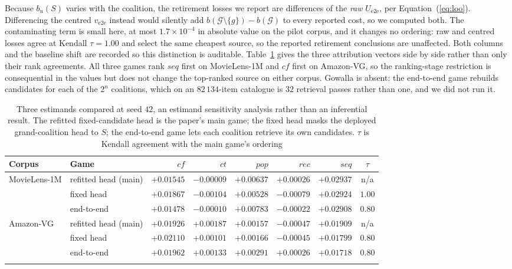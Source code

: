 \documentclass[pdflatex,sn-basic,Numbered]{sn-jnl}
\theoremstyle{plain}
\theoremstyle{definition}
\newcommand{\G}{\mathcal{G}}
\begin{document}
Because $b_u(S)$ varies with the coalition, the retirement losses we report are
differences of the \emph{raw} $U_{\mathrm{e2e}}$, per
Equation~(\ref{eq:loo}). Differencing the centred $v_{\mathrm{e2e}}$ instead
would silently add $b(\G\setminus\{g\}) - b(\G)$ to every reported cost, so we
computed both. The
contaminating term is small here, at most $1.7\times10^{-4}$ in absolute value
on the pilot corpus, and it changes no ordering: raw and centred losses agree
at Kendall $\tau = 1.00$ and select the same cheapest source, so the reported
retirement conclusions are unaffected. Both columns and the baseline shift are
recorded so this distinction is auditable. Table~\ref{tab:estimands} gives the three
attribution vectors side by side rather than only their rank agreements. All
three games rank $seq$ first on MovieLens-1M and $cf$ first on Amazon-VG, so
the ranking-stage restriction is consequential in the values but does not
change the top-ranked source on either corpus. Gowalla is absent: the
end-to-end game rebuilds candidates for each of the $2^n$ coalitions, which on
an $82\,134$-item catalogue is $32$ retrieval passes rather than one, and we
did not run it.

\begin{table}[tbp]
\caption{Three estimands compared at seed $42$, an estimand sensitivity
analysis rather than an inferential result. The refitted fixed-candidate head
is the paper's main game; the fixed head masks the deployed grand-coalition
head to $S$; the end-to-end game lets each coalition retrieve its own
candidates. $\tau$ is Kendall agreement with the main game's ordering}
\label{tab:estimands}
\small
\setlength{\tabcolsep}{3.5pt}
\begin{tabular}{@{}llrrrrrc@{}}
\toprule
Corpus & Game & $cf$ & $ct$ & $pop$ & $rec$ & $seq$ & $\tau$ \\
\midrule
MovieLens-1M & refitted head (main) & $+0.01545$ & $-0.00009$ & $+0.00637$ & $+0.00026$ & $+0.02937$ & n/a \\
             & fixed head           & $+0.01867$ & $-0.00104$ & $+0.00528$ & $-0.00079$ & $+0.02924$ & $1.00$ \\
             & end-to-end           & $+0.01478$ & $-0.00010$ & $+0.00783$ & $-0.00022$ & $+0.02908$ & $0.80$ \\
\midrule
Amazon-VG    & refitted head (main) & $+0.01926$ & $+0.00187$ & $+0.00157$ & $-0.00047$ & $+0.01909$ & n/a \\
             & fixed head           & $+0.02110$ & $+0.00101$ & $+0.00166$ & $-0.00045$ & $+0.01799$ & $0.80$ \\
             & end-to-end           & $+0.01962$ & $+0.00133$ & $+0.00291$ & $+0.00026$ & $+0.01718$ & $0.80$ \\
\botrule
\end{tabular}
\end{table}
\end{document}
